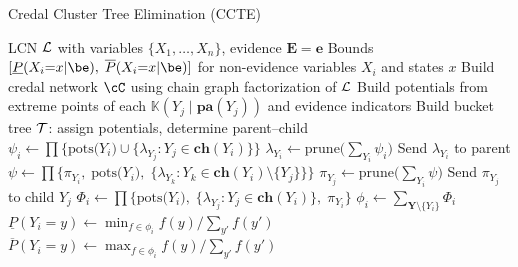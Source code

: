 \documentclass{article}
\newcommand{\kr}[1]{\mathbb{K}\!\left( #1 \right)}
\begin{document}
\begin{algorithm}[t]
\caption{Credal Cluster Tree Elimination (CCTE)}
\label{alg:cte}
\begin{multicols}{2}
\begin{algorithmic}[1]
\Require LCN $\mathcal{L}$ with variables $\{X_1, \ldots, X_n\}$, evidence $\mathbf{E} = \mathbf{e}$
\Ensure Bounds $[\underline{P}(X_i{=}x|\be),\; \overline{P}(X_i{=}x|\be)]$ for
        non-evidence variables $X_i$ and states $x$
\Statex
\State Build credal network $\cC$ using chain graph factorization of $\mathcal{L}$
\State Build potentials from extreme points of each $\kr{Y_j\mid \mathbf{pa}(Y_j)}$ and evidence indicators
\State Build bucket tree $\mathcal{T}$: assign potentials, determine parent--child
\Statex
{}
  \State $\psi_i \gets \prod\{\text{pots($Y_i$)} \cup \{\lambda_{Y_j} : Y_j \in \mathbf{ch}(Y_i)\}\}$
  \State $\lambda_{Y_i} \gets \mathrm{prune}\bigl(\sum_{Y_i} \psi_i\bigr)$
  \State Send $\lambda_{Y_i}$ to parent
\EndFor
{}
    \State $\psi \gets \prod\{\pi_{Y_i},\;\text{pots($Y_i$)},\;
           \{\lambda_{Y_k} : Y_k \in \mathbf{ch}(Y_i) \setminus \{Y_j\}\}\}$
    \State $\pi_{Y_j} \gets \mathrm{prune}\bigl(\sum_{Y_i} \psi\bigr)$
    \State Send $\pi_{Y_j}$ to child $Y_j$
  \EndFor
\EndFor
{}
  \State $\Phi_i \gets \prod\{\text{pots($Y_i$)},\;
         \{\lambda_{Y_j} : Y_j \in \mathbf{ch}(Y_i)\},\; \pi_{Y_i}\}$
  \State $\phi_i \gets \sum_{\mathbf{Y} \setminus \{Y_i\}} \Phi_i$
  \State $\underline{P}(Y_i{=}y) \gets \min_{f \in \phi_i} f(y)/\sum_{y'} f(y')$
  \State $\overline{P}(Y_i{=}y) \gets \max_{f \in \phi_i} f(y)/\sum_{y'} f(y')$
\EndFor
\end{algorithmic}
\end{multicols}
\end{algorithm}
\end{document}
